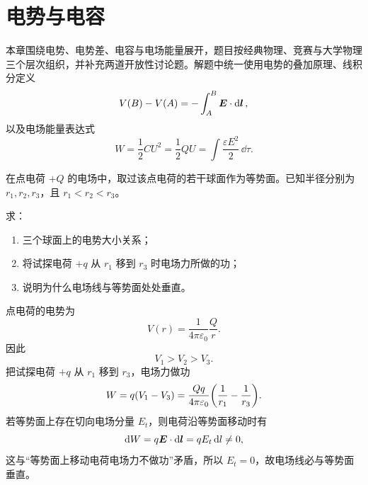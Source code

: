 \chapter{电势与电容}

本章围绕电势、电势差、电容与电场能量展开，题目按经典物理、竞赛与大学物理三个层次组织，并补充两道开放性讨论题。解题中统一使用电势的叠加原理、线积分定义
\[
V(B)-V(A)=-\int_A^B \vb*{E}\cdot \dd{\vb*{l}},
\]
以及电场能量表达式
\[
W=\frac12 CU^2=\frac12 QU=\int \frac{\varepsilon E^2}{2}\,\dd{\tau}.
\]

\begin{classic}
在点电荷 $+Q$ 的电场中，取过该点电荷的若干球面作为等势面。已知半径分别为 $r_1,r_2,r_3$，且 $r_1<r_2<r_3$。

\begin{center}
\end{center}

求：
\begin{enumerate}
  \item 三个球面上的电势大小关系；
  \item 将试探电荷 $+q$ 从 $r_1$ 移到 $r_3$ 时电场力所做的功；
  \item 说明为什么电场线与等势面处处垂直。
\end{enumerate}

\begin{solution}
点电荷的电势为
\[
V(r)=\frac{1}{4\pi\varepsilon_0}\frac{Q}{r}.
\]
因此
\[
V_1>V_2>V_3.
\]
把试探电荷 $+q$ 从 $r_1$ 移到 $r_3$，电场力做功
\[
W=q(V_1-V_3)=\frac{Qq}{4\pi\varepsilon_0}\qty(\frac{1}{r_1}-\frac{1}{r_3}).
\]
若等势面上存在切向电场分量 $E_t$，则电荷沿等势面移动时有
\[
\dd{W}=q\vb*{E}\cdot \dd{\vb*{l}}=qE_t\dd{l}\neq 0,
\]
这与“等势面上移动电荷电场力不做功”矛盾，所以 $E_t=0$，故电场线必与等势面垂直。
\end{solution}
\end{classic}

